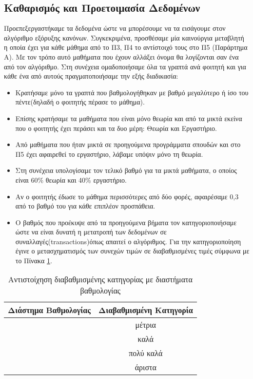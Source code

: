 \documentclass[12pt,a4paper,final]{article}
\begin{document}
\subsection{Καθαρισμός και Προετοιμασία Δεδομένων}
Προεπεξεργαστήκαμε τα δεδομένα ώστε να μπορέσουμε να τα εισάγουμε στον αλγόριθμο εξόρυξης κανόνων. Συγκεκριμένα, προσθέσαμε μία καινούργια μεταβλητή  η οποία  έχει για κάθε μάθημα από το Π3, Π4  το αντίστοιχό τους στο Π5 (Παράρτημα Α). Με τον τρόπο αυτό μαθήματα που έχουν αλλάξει όνομα θα λογίζονται σαν ένα από τον αλγόριθμο. Στη συνέχεια ομαδοποιήσαμε  όλα τα γραπτά ανά φοιτητή και για κάθε ένα από αυτούς πραγματοποιήσαμε την εξής διαδικασία:
\begin{itemize}
\item Κρατήσαμε μόνο τα γραπτά  που βαθμολογήθηκαν με βαθμό μεγαλύτερο ή ίσο του πέντε(δηλαδή ο φοιτητής πέρασε το μάθημα).
\item Επίσης κρατήσαμε τα μαθήματα που είναι μόνο θεωρία και από τα μικτά εκείνα που ο φοιτητής έχει περάσει  και τα δυο μέρη: Θεωρία και Εργαστήριο.
\item Από μαθήματα που ήταν  μικτά σε προηγούμενα προγράμματα σπουδών  και στο Π5 έχει αφαιρεθεί το εργαστήριο, λάβαμε υπόψιν μόνο τη θεωρία.
\item Στη συνέχεια υπολογίσαμε τον τελικό βαθμό για τα μικτά μαθήματα, ο οποίος είναι 60\% θεωρία και 40\% εργαστήριο.
\item Αν ο φοιτητής έδωσε το μάθημα περισσότερες από δύο φορές, αφαιρέσαμε 0,3 από το βαθμό του για κάθε επιπλέον προσπάθεια.
\item Ο βαθμός που προέκυψε από τα προηγούμενα βήματα τον κατηγοριοποιήσαμε ώστε να είναι δυνατή η μετατροπή των δεδομένων σε συναλλαγές(\foreignlanguage{english}{transactions})όπως απαιτεί ο αλγόριθμος. Για την κατηγοριοποίηση έγινε ο μετασχηματισμός των συνεχών τιμών σε  διαβαθμισμένες τιμές  σύμφωνα με το Πίνακα \ref{table:discetize}.
\end{itemize} 


\begin{table}[h]
\centering
\begin{tabular}{|c|c|}
\hline 
Διάστημα Βαθμολογίας & Διαβαθμισμένη Κατηγορία\\ 
\hline 
   [0, 6.5] & μέτρια \\ 
\hline 
[6.6, 7.5] & καλά \\ 
\hline 
[7.7, 8.5] & πολύ καλά \\ 
\hline 
[8.6, 10] & άριστα \\ 
\hline 
\end{tabular}
\caption{Αντιστοίχηση διαβαθμισμένης κατηγορίας με διαστήματα βαθμολογίας} 
\label{table:discetize}
\end{table} \medskip
\end{document}
